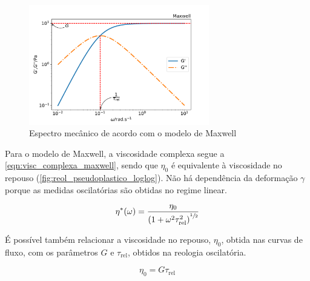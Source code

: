 			\begin{figure}[h]
				\centering
				\includegraphics[width=0.7\textwidth]{./imagens/reologia/modelo_maxwell}
				\caption{Espectro mecânico de acordo com o modelo de Maxwell}
				\label{fig:modelo_maxwell}
			\end{figure} 
			
			Para o modelo de Maxwell, a viscosidade complexa segue a \autoref{eqn:visc_complexa_maxwell}, sendo que \(\eta_0\) é equivalente à viscosidade no repouso (\autoref{fig:reol_pseudoplastico_loglog}). Não há dependência da deformação \(\gamma\) porque as medidas oscilatórias são obtidas no regime linear.\cite{Rehage1991}
			
			\begin{equation}
				 \eta^* (\omega) = \dfrac{\eta_0}{\left( 1 + \omega^2 \tau_\mathrm{rel}^2 \right)^{\sfrac{1}{2}}}
				\label{eqn:visc_complexa_maxwell}
			\end{equation} 
			
			É possível também relacionar a viscosidade no repouso, \(\eta_0\), obtida nas curvas de fluxo, com os parâmetros \(G\) e \(\tau_{\mathrm{rel}}\), obtidos na reologia oscilatória.\cite{Rehage1991} 
			
			\begin{equation}
				\eta_0 = G \tau_{\mathrm{rel}}
				\label{eqn:eta0_g0_taurel}
			\end{equation}  
			
			
